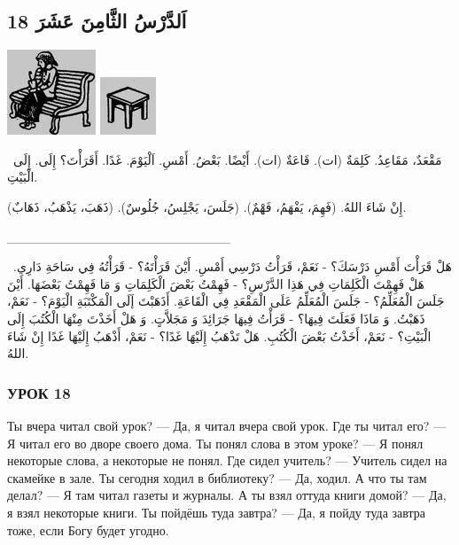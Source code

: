 \documentclass[a5paper]{article}
\begin{document}
\subsection{18 اَلدَّرْسُ الثَّامِنَ عَشَرَ}
 \includegraphics[width=1.0417in,height=1in]{images/MuhammadBagauddinprettified-img032.jpg}   \includegraphics[width=0.6563in,height=0.6772in]{images/MuhammadBagauddinprettified-img033.jpg} 

\ مَقْعَدٌ، مَقَاعِدُ. كَلِمَةٌ (ات). قَاعَةٌ (ات). أَيْضًا. بَعْضُ. أَمْسِ. اَلْيَوْمَ. غَدًا. أَقَرَأْتَ؟ إِلَى. إِلَى الْبَيْتِ.

إِنْ شَاءَ اللهُ. (فَهِمَ، يَفْهَمُ، فَهْمٌ). (جَلَسَ، يَجْلِسُ، جُلُوسٌ). (ذَهَبَ، يَذْهَبُ، ذَهَابٌ).

\_\_\_\_\_\_\_\_\_\_\_\_\_\_\_\_\_\_\_\_\_\_\_\_

\ هَلْ قَرَأْتَ أَمْسِ دَرْسَكَ؟ - نَعَمْ، قَرَأْتُ دَرْسِي أَمْسِ. أَيْنَ قَرَأْتَهُ؟ - قَرَأْتُهُ فِي سَاحَةِ دَارِي. هَلْ فَهِمْتَ الْكَلِمَاتِ فِي هَذِا الدَّرْسِ؟ - فَهِمْتُ بَعْضَ الْكَلِمَاتِ وَ مَا فَهِمْتُ بَعْضَهَا. أَيْنَ جَلَسَ الْمُعَلِّمُ؟ - جَلَسَ الْمُعَلِّمُ عَلَى الْمَقْعَدِ فِي الْقَاعَةِ. أَذَهَبْتَ إَلَى الْمَكْتَبَةِ الْيَوْمَ؟ - نَعَمْ، ذَهَبْتُ. وَ مَاذَا فَعَلَتَ فِيهَا؟ - قَرَأْتُ فِيهَا جَرَائِدَ وَ مَجَلاَّتٍ. وَ هَلْ أَخَذْتَ مِنْهَا الْكُتُبَ إِلَى الْبَيْتِ؟ - نَعَمْ، أَخَذْتُ بَعْضَ الْكُتُبِ. هَلْ تَذْهَبُ إِلَيْهَا غَدًا؟ - نَعَمْ، أَذْهَبُ إِلَيْهَا غَدًا إِنْ شَاءَ اللهُ.

\subsubsection{УРОК 18}
Ты вчера читал свой урок? — Да, я читал вчера свой урок. Где ты читал его? — Я читал его во дворе своего дома. Ты понял слова в этом уроке? — Я понял некоторые слова, а некоторые не понял. Где сидел учитель? — Учитель сидел на скамейке в зале. Ты сегодня ходил в библиотеку? — Да, ходил. А что ты там делал? — Я там читал газеты и журналы. А ты взял оттуда книги домой? — Да, я взял некоторые книги. Ты пойдёшь туда завтра? — Да, я пойду туда завтра тоже, если Богу будет угодно.
\end{document}
